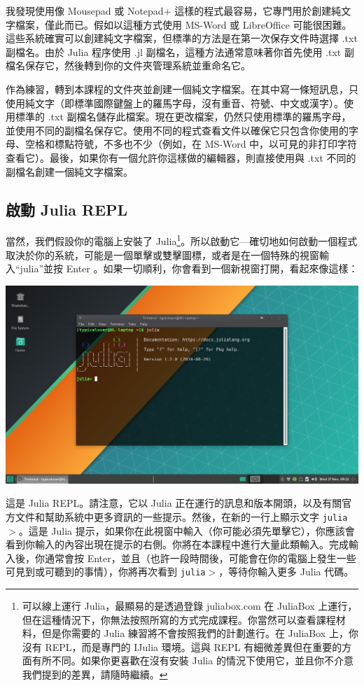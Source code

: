 \documentclass[]{article}
\begin{document}
我發現使用像 Mousepad 或 Notepad+ 這樣的程式最容易，它專門用於創建純文字檔案，僅此而已。假如以這種方式使用 MS-Word 或 LibreOffice 可能很困難。這些系統確實可以創建純文字檔案，但標準的方法是在第一次保存文件時選擇 .txt 副檔名。由於 Julia 程序使用 .jl 副檔名，這種方法通常意味著你首先使用 .txt 副檔名保存它，然後轉到你的文件夾管理系統並重命名它。

作為練習，轉到本課程的文件夾並創建一個純文字檔案。在其中寫一條短訊息，只使用純文字（即標準國際鍵盤上的羅馬字母，沒有重音、符號、中文或漢字）。使用標準的 .txt 副檔名儲存此檔案。現在更改檔案，仍然只使用標準的羅馬字母，並使用不同的副檔名保存它。使用不同的程式查看文件以確保它只包含你使用的字母、空格和標點符號，不多也不少（例如，在 MS-Word 中，以可見的非打印字符查看它）。最後，如果你有一個允許你這樣做的編輯器，則直接使用與 .txt 不同的副檔名創建一個純文字檔案。

\subsection*{啟動 Julia REPL}

當然，我們假設你的電腦上安裝了 Julia\footnote{可以線上運行 Julia，最顯易的是透過登錄 juliabox.com 在 JuliaBox 上運行，但在這種情況下，你無法按照所寫的方式完成課程。你當然可以查看課程材料，但是你需要的 Julia 練習將不會按照我們的計劃進行。在 JuliaBox 上，你沒有 REPL，而是專門的 IJulia 環境。這與 REPL 有細微差異但在重要的方面有所不同。如果你更喜歡在沒有安裝 Julia 的情況下使用它，並且你不介意我們提到的差異，請隨時繼續。}。所以啟動它---確切地如何啟動一個程式取決於你的系統，可能是一個單擊或雙擊圖標，或者是在一個特殊的視窗輸入``julia''並按 Enter 。如果一切順利，你會看到一個新視窗打開，看起來像這樣：

\includegraphics[scale=0.25]{REPL.png}

這是 Julia REPL。請注意，它以 Julia 正在運行的訊息和版本開頭，以及有關官方文件和幫助系統中更多資訊的一些提示。然後，在新的一行上顯示文字 {\tt julia$ > $}。這是 Julia 提示，如果你在此視窗中輸入（你可能必須先單擊它），你應該會看到你輸入的內容出現在提示的右側。你將在本課程中進行大量此類輸入。完成輸入後，你通常會按 Enter，並且（也許一段時間後，可能會在你的電腦上發生一些可見到或可聽到的事情），你將再次看到 {\tt julia$ > $}，等待你輸入更多 Julia 代碼。
\end{document}
